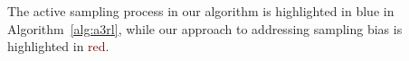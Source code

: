 The active sampling process in our algorithm is highlighted in \textcolor{NavyBlue}{blue} in Algorithm~\ref{alg:a3rl}, while our approach to addressing sampling bias is highlighted in \textcolor{Maroon}{red}.





























 
           



 






 
           



 






